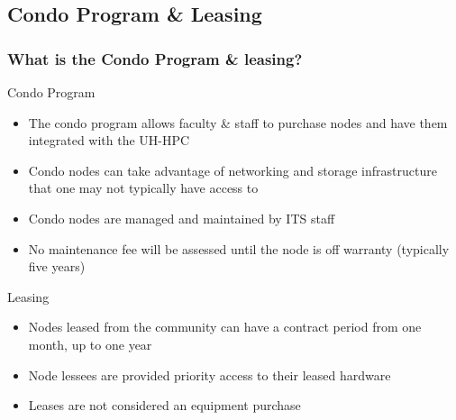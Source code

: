 \subsection{Condo Program \& Leasing}
\begin{frame}
  \frametitle{What is the Condo Program \& leasing?}
	\begin{block}{Condo Program}\scriptsize
		\begin{itemize}
		\item The condo program allows faculty \& staff to purchase nodes and have them integrated with the UH-HPC
		\item Condo nodes can take advantage of networking and storage infrastructure that one may not typically have access to
		\item Condo nodes are managed and maintained by ITS staff
		\item No maintenance fee will be assessed until the node is off warranty (typically five years)
		\end{itemize}
	\end{block}
	\begin{block}{Leasing}\scriptsize
		\begin{itemize}
		\item Nodes leased from the community can have a contract period from one month, up to one year
		\item Node lessees are provided priority access to their leased hardware
		\item Leases are not considered an equipment purchase
		\end{itemize}
	\end{block}
\end{frame}

